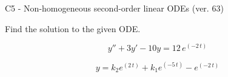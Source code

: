 \begin{exercise}
  \begin{exerciseTitle}C5 - Non-homogeneous second-order linear ODEs (ver. 63)\end{exerciseTitle}
  \begin{exerciseStatement}
    
Find the solution to the given ODE.

    
\[y''+3y'-10y = 12 \, e^{\left(-2 \, t\right)}\]

  \end{exerciseStatement}
  \begin{exerciseAnswer}
    
\[y= k_{2} e^{\left(2 \, t\right)} + k_{1} e^{\left(-5 \, t\right)} - e^{\left(-2 \, t\right)}\]

  \end{exerciseAnswer}
\end{exercise}